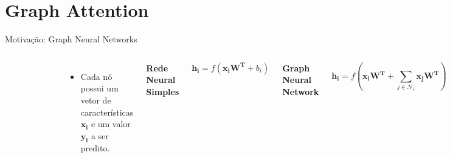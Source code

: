 \documentclass{beamer}
\begin{document}
\section{Graph Attention}
\begin{frame}{Motivação: Graph Neural Networks}

	\begin{columns}[t]
		\vspace{-5mm}
    \begin{figure}[h]
      \centering
      \includegraphics[width=0.5\textwidth]{assets/Grafo.png}
    \end{figure}
    \small
    \begin{itemize}
      \item Cada nó possui um vetor de características $\bm{x_i}$ e um valor $\bm{y_i}$ a ser predito.
    \end{itemize}

		\vspace{-5mm}
    \begin{center}
      \textbf{Rede Neural Simples}
    \end{center}
    \[
      \bm{h_i} = f(\bm{x_i W^T} + b_i)
    \]

		\vspace{3mm}
    \begin{center}
      \textbf{Graph Neural Network}
    \end{center}
    \[
      \bm{h_i} = f\left(\bm{x_i W^T} + \sum_{j \in \mathcal{N}_i} \bm{x_j W^T} \right)
    \]
    \small
    \begin{itemize}
      \item Agrega as features dos vizinhos de $i$ ($\mathcal{N}_i$)
      \item Graph Convolutional Networks (GCNs) normalizam os pesos pelo grau dos nós.
    \end{itemize}
    \vfill
  \end{columns}

\end{frame}
\end{document}
